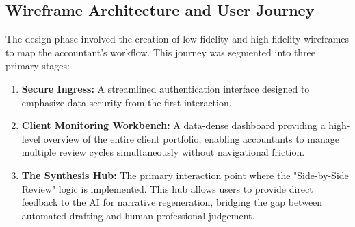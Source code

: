 \subsection{Wireframe Architecture and User Journey}
The design phase involved the creation of low-fidelity and high-fidelity wireframes to map the accountant's workflow. This journey was segmented into three primary stages:
\begin{enumerate}
    \item \textbf{Secure Ingress:} A streamlined authentication interface designed to emphasize data security from the first interaction.
    \item \textbf{Client Monitoring Workbench:} A data-dense dashboard providing a high-level overview of the entire client portfolio, enabling accountants to manage multiple review cycles simultaneously without navigational friction.
    \item \textbf{The Synthesis Hub:} The primary interaction point where the "Side-by-Side Review" logic is implemented. This hub allows users to provide direct feedback to the AI for narrative regeneration, bridging the gap between automated drafting and human professional judgement.
\end{enumerate}
